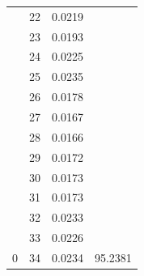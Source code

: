 \documentclass{article}
\begin{document}
\begin{multicols}{2}
\begin{table}[H]
\begin{tabular}{|c|c|c|c|}
 & 22 & 0.0219 & \cellcolor[HTML]{FFFFC7} \\ \cline{2-3}
 & 23 & 0.0193 & \cellcolor[HTML]{FFFFC7} \\ \cline{2-3}
 & 24 & 0.0225 & \cellcolor[HTML]{FFFFC7} \\ \cline{2-3}
 & 25 & 0.0235 & \cellcolor[HTML]{FFFFC7} \\ \cline{2-3}
 & 26 & 0.0178 & \cellcolor[HTML]{FFFFC7} \\ \cline{2-3}
 & 27 & 0.0167 & \cellcolor[HTML]{FFFFC7} \\ \cline{2-3}
 & 28 & 0.0166 & \cellcolor[HTML]{FFFFC7} \\ \cline{2-3}
 & 29 & 0.0172 & \cellcolor[HTML]{FFFFC7} \\ \cline{2-3}
 & 30 & 0.0173 & \cellcolor[HTML]{FFFFC7} \\ \cline{2-3}
 & 31 & 0.0173 & \cellcolor[HTML]{FFFFC7} \\ \cline{2-3}
 & 32 & 0.0233 & \cellcolor[HTML]{FFFFC7} \\ \cline{2-3}
 & 33 & 0.0226 & \cellcolor[HTML]{FFFFC7} \\ \cline{2-3}
\multirow{-35}{*}{0} & 34 & 0.0234 & \multirow{-24}{*}{\cellcolor[HTML]{FFFFC7}95.2381} \\ \hline
\end{tabular}
\end{table}



\end{multicols}
\end{document}
